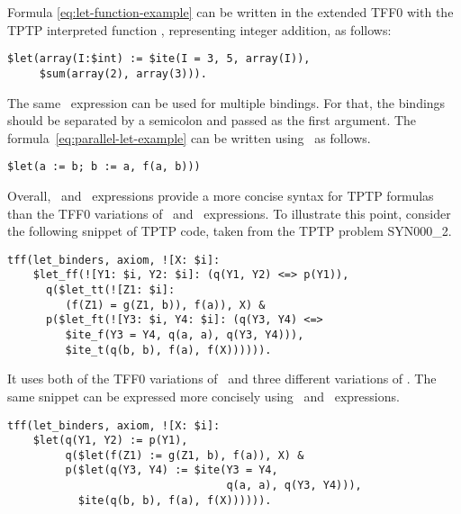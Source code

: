 Formula \eqref{eq:let-function-example} can be written in the extended TFF0 with the TPTP interpreted function \dsum, representing integer addition, as follows:
\begin{lstlisting}[language=tptp]
$let(array(I:$int) := $ite(I = 3, 5, array(I)),
     $sum(array(2), array(3))).
\end{lstlisting}


The same \dlet\ expression can be used for multiple bindings. For that, the bindings should be separated by a semicolon and passed as the first argument. The formula~\eqref{eq:parallel-let-example} can be written using \dlet\ as follows.
\begin{lstlisting}[language=tptp]
$let(a := b; b := a, f(a, b)))
\end{lstlisting}

Overall, \dite\ and \dlet\ expressions provide a more concise syntax for TPTP formulas than the TFF0 variations of \ITE\ and \LETIN\  expressions. To illustrate this point, consider the following snippet of TPTP code, taken from the TPTP problem \mbox{SYN000\_2}.
\begin{lstlisting}[language=tptp]
tff(let_binders, axiom, ![X: $i]:
    $let_ff(![Y1: $i, Y2: $i]: (q(Y1, Y2) <=> p(Y1)),
      q($let_tt(![Z1: $i]:
         (f(Z1) = g(Z1, b)), f(a)), X) &
      p($let_ft(![Y3: $i, Y4: $i]: (q(Y3, Y4) <=>
         $ite_f(Y3 = Y4, q(a, a), q(Y3, Y4))),
         $ite_t(q(b, b), f(a), f(X)))))).
\end{lstlisting}

It uses both of the TFF0 variations of \ITE\ and three different variations of \LETIN. The same snippet can be expressed more concisely using \dite\ and \dlet\ expressions.
\begin{lstlisting}[language=tptp]
tff(let_binders, axiom, ![X: $i]:
    $let(q(Y1, Y2) := p(Y1),
         q($let(f(Z1) := g(Z1, b), f(a)), X) &
         p($let(q(Y3, Y4) := $ite(Y3 = Y4,
                                  q(a, a), q(Y3, Y4))),
           $ite(q(b, b), f(a), f(X)))))).
\end{lstlisting}
